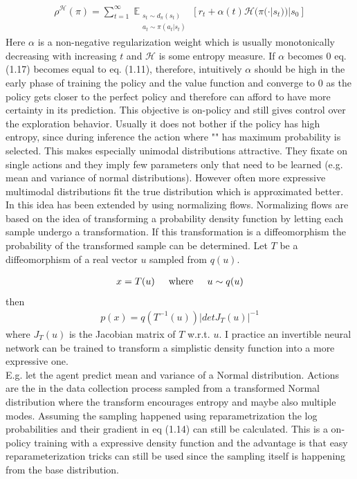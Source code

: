\begin{align}
\rho^{\mathcal{H}}(\pi) = \sum_{t=1}^{\infty}\mathop{\mathbb{E}}_{\substack{s_t \sim d_\pi(s_t) \\ a_t \sim \pi(a_t|s_t)}} \left[ r_t + \alpha(t) \mathcal{H}(\pi(\cdot | s_t))|s_0 \right]
\end{align}
Here $\alpha$ is a non-negative regularization weight which is usually monotonically decreasing with increasing $t$ and $\mathcal{H}$ is some entropy measure. If $\alpha$ becomes $0$ eq. (1.17) becomes equal to eq. (1.11), therefore, intuitively $\alpha$ should be high in the early phase of training the policy and the value function and converge to $0$ as the policy gets closer to the perfect policy and therefore can afford to have more certainty in its prediction.
This objective is on-policy and still gives control over the exploration behavior. Usually it does not bother if the policy has high entropy, since during inference the action where "\pi" has maximum probability is selected. This makes especially unimodal distributions attractive. They fixate on single actions and they imply few parameters only that need to be learned (e.g. mean and variance of normal distributions). However often more expressive multimodal distributions fit the true distribution which is approximated better. 
In \cite{DBLP:journals/corr/abs-1906-02771} this idea has been extended by using  normalizing flows. Normalizing flows \cite{papamakarios2019normalizing} are based on the idea of transforming a probability density function by letting each sample undergo a transformation. If this transformation is a diffeomorphism the probability of the transformed sample can be determined. Let $T$ be a diffeomorphism of a real vector $u$ sampled from $q(u)$.

\begin{align}
	x=T(u) \text{\hspace{5mm}where\hspace{5mm}} u\sim q(u)
\end{align}
then
\begin{align}
p(x)=q(T^{-1}(u)) |detJ_T(u)|^{-1}
\end{align}
where $J_T(u)$ is the Jacobian matrix of $T$ w.r.t. $u$. I practice an invertible neural network can be trained to transform a simplistic density function into a more expressive one.\\
E.g. let the agent predict mean and variance of a Normal distribution. Actions are the in the data collection process sampled from a transformed Normal distribution where the transform encourages entropy and maybe also multiple modes. Assuming the sampling happened using reparametrization the log probabilities and their gradient in eq (1.14) can still be calculated. This is a on-policy training with a expressive density function and the advantage is that easy reparameterization tricks can still be used since the sampling itself is happening from the base distribution.

